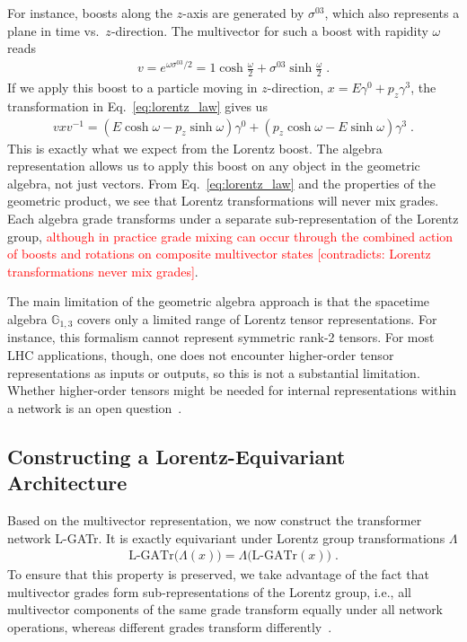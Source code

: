 \documentclass[submission, Phys]{SciPost}
\begin{document}
For instance, boosts along the $z$-axis are generated by $\sigma^{03}$, which also represents a plane in time vs.\ $z$-direction. The multivector for such a boost with rapidity $\omega$ reads
%
\begin{align}
    v = e^{\omega \sigma^{03}/2} = 1\cosh \frac{\omega}{2} + \sigma^{03}\sinh \frac{\omega}{2}  \; .
\end{align}
%
If we apply this boost to a particle moving in $z$-direction, $x=E\gamma^0+p_z\gamma^3$, the transformation in Eq.~\eqref{eq:lorentz_law} gives us 
%
\begin{align}
    vxv^{-1} = (E\cosh \omega - p_z\sinh \omega)\gamma^0 + (p_z\cosh \omega - E\sinh \omega)\gamma^3 \; .
\end{align}
%
This is exactly what we expect from the Lorentz boost. The algebra representation allows us to apply this boost on any object in the geometric algebra, not just vectors. From Eq.~\eqref{eq:lorentz_law} and the properties of the geometric product, we see that Lorentz transformations will never mix grades. Each algebra grade transforms under a separate sub-representation of the Lorentz group, \textcolor{red}{although in practice grade mixing can occur through the combined action of boosts and rotations on composite multivector states [contradicts: Lorentz transformations never mix grades]}.

The main limitation of the geometric algebra approach is that the spacetime algebra $\mathbb{G}_{1,3}$ covers only a limited range of Lorentz tensor representations. For instance, this formalism cannot represent symmetric rank-2 tensors. For most LHC applications, though, one does not encounter higher-order tensor representations as inputs or outputs, so this is not a substantial limitation.  Whether higher-order tensors might be needed for internal representations within a network is an open question~\cite{DBLP:journals/corr/abs-2106-06610}.

\subsection{Constructing a Lorentz-Equivariant Architecture}

Based on the multivector representation, we now construct the transformer network L-GATr. It is exactly equivariant under Lorentz group transformations $\Lambda$
%
\begin{align}
    \text{L-GATr}\Big(\Lambda(x)\Big) = \Lambda \Big(\text{L-GATr}(x)\Big) \; .
\end{align}
%
To ensure that this property is preserved, we take advantage of the fact that multivector grades form sub-representations of the Lorentz group, i.e., all multivector components of the same grade transform equally under all network operations, whereas different grades transform differently~\cite{brehmer2023geometric,Spinner:2024hjm}.
\end{document}
